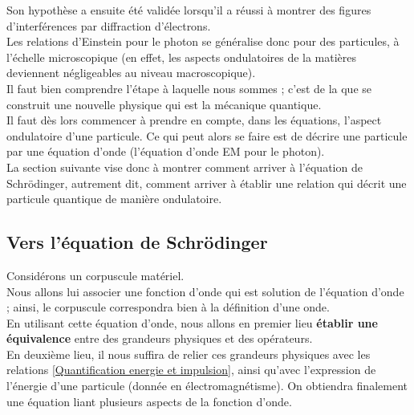 \documentclass[../notesdecours]{subfiles}
\begin{document}
Son hypothèse a ensuite été validée lorsqu'il a réussi à montrer des figures d'interférences par diffraction d'électrons. \\
Les relations d'Einstein pour le photon se généralise donc pour des particules, à l'échelle microscopique (en effet, les aspects ondulatoires de la matières deviennent négligeables au niveau macroscopique). \\
Il faut bien comprendre l'étape à laquelle nous sommes ; c'est de la que se construit une nouvelle physique qui est la mécanique quantique. \\

Il faut dès lors commencer à prendre en compte, dans les équations, l'aspect ondulatoire d'une particule. Ce qui peut alors se faire est de décrire une particule par une équation d'onde (l'équation d'onde EM pour le photon).\\
La section suivante vise donc à montrer comment arriver à l'équation de Schrödinger, autrement dit, comment arriver à établir une relation qui décrit une particule quantique de manière ondulatoire. 

\subsection{Vers l'équation de Schrödinger}
Considérons un corpuscule matériel. \\
Nous allons lui associer une fonction d'onde qui est solution de l'équation d'onde ; ainsi, le corpuscule correspondra bien à la définition d'une onde. \\
En utilisant cette équation d'onde, nous allons en premier lieu \textbf{établir une équivalence} entre des grandeurs physiques et des opérateurs. \\
En deuxième lieu, il nous suffira de relier ces grandeurs physiques avec les relations \ref{Quantification energie et impulsion}, ainsi qu'avec l'expression de l'énergie d'une particule (donnée en électromagnétisme).
On obtiendra finalement une équation liant plusieurs aspects de la fonction d'onde.\\
\end{document}
